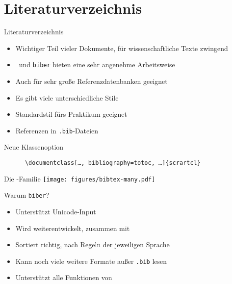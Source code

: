 \section{Literaturverzeichnis}

\begin{frame}[fragile]{Literaturverzeichnis}
  \begin{itemize}
    \item Wichtiger Teil vieler Dokumente, für wissenschaftliche Texte zwingend
    \item \BibLaTeX\ und \texttt{biber} bieten eine sehr angenehme Arbeitsweise
    \item Auch für sehr große Referenzdatenbanken geeignet
    \item Es gibt viele unterschiedliche Stile
    \item Standardstil fürs Praktikum geeignet
    \item Referenzen in \texttt{.bib}-Dateien
  \end{itemize}
  \begin{block}{Neue Klassenoption}
    \begin{verbatim}
      \documentclass[…, bibliography=totoc, …]{scrartcl}
    \end{verbatim}
  \end{block}
\end{frame}

\begin{frame}{Die \BibTeX-Familie}
  \centering
  \vspace{0.025\textheight}
  \texttt{[image: figures/bibtex-many.pdf]}
\end{frame}

\begin{frame}{Warum \texttt{biber}?
    \hfill
  }
  \begin{itemize}
    \item Unterstützt Unicode-Input
    \item Wird weiterentwickelt, zusammen mit \BibLaTeX
    \item Sortiert richtig, nach Regeln der jeweiligen Sprache
    \item Kann noch viele weitere Formate außer \texttt{.bib} lesen
    \item Unterstützt alle Funktionen von \BibLaTeX
  \end{itemize}
\end{frame}

